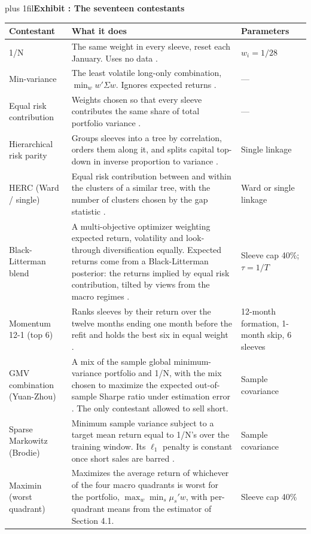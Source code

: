 \documentclass[12pt,letterpaper]{article}
\newcommand{\nuevo}[1]{{\color{nuevoc}#1}}
\newcounter{exhibit}
\renewcommand{\theexhibit}{\arabic{exhibit}}
\newcommand{\exhibitflush}{%
  \leftskip=0pt\relax \rightskip=0pt\relax
  \parfillskip=0pt plus 1fil\relax \parindent=0pt\relax}
\newcommand{\exhibittitle}[2]{%
  \refstepcounter{exhibit}%
  \par{\exhibitflush\textbf{Exhibit \theexhibit: #1}\label{#2}\par}%
  \vspace{5pt}}
\begin{document}
\begin{table}[H]
\centering
\exhibittitle{\nuevo{The seventeen contestants}}{ex:contestants}
\fontsize{8}{9.6}\selectfont
\color{nuevoc}
\begin{tabular}{p{3.3cm}p{8.6cm}p{3.3cm}}
\toprule
Contestant & What it does & Parameters \\
\midrule
1/N & The same weight in every sleeve, reset each January. Uses no data \citep{demiguel2009}. & $w_i = 1/28$ \\
Min-variance & The least volatile long-only combination, $\min_w w'\Sigma w$. Ignores expected returns \citep{clarke2006}. & --- \\
Equal risk contribution & Weights chosen so that every sleeve contributes the same share of total portfolio variance \citep{maillard2010}. & --- \\
Hierarchical risk parity & Groups sleeves into a tree by correlation, orders them along it, and splits capital top-down in inverse proportion to variance \citep{lopezdeprado2016}. & Single linkage \\
HERC (Ward / single) & Equal risk contribution between and within the clusters of a similar tree, with the number of clusters chosen by the gap statistic \citep{raffinot2018,tibshirani2001}. & Ward or single linkage \\
Black-Litterman blend & A multi-objective optimizer weighting expected return, volatility and look-through diversification equally. Expected returns come from a Black-Litterman posterior: the returns implied by equal risk contribution, tilted by views from the macro regimes \citep{black1992}. & Sleeve cap 40\%; $\tau = 1/T$ \\
Momentum 12-1 (top 6) & Ranks sleeves by their return over the twelve months ending one month before the refit and holds the best six in equal weight \citep{jegadeesh1993}. & 12-month formation, 1-month skip, 6 sleeves \\
GMV combination (Yuan-Zhou) & A mix of the sample global minimum-variance portfolio and 1/N, with the mix chosen to maximize the expected out-of-sample Sharpe ratio under estimation error \citep{yuan2023}. The only contestant allowed to sell short. & Sample covariance \\
Sparse Markowitz (Brodie) & Minimum sample variance subject to a target mean return equal to 1/N's over the training window. Its $\ell_1$ penalty is constant once short sales are barred \citep{brodie2009}. & Sample covariance \\
Maximin (worst quadrant) & Maximizes the average return of whichever of the four macro quadrants is worst for the portfolio, $\max_w \min_s \mu_s'w$, with per-quadrant means from the estimator of Section 4.1. & Sleeve cap 40\% \\

\end{tabular}
\end{table}
\end{document}
